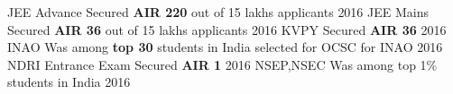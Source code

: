 \begin{cvhonors}
  \cvhonor
    {JEE Advance}
    {Secured \textbf{AIR 220} out of 15 lakhs applicants}
    {}
    {2016}
  \cvhonor
    {JEE Mains}
    {Secured \textbf{AIR 36} out of 15 lakhs applicants}
    {}
    {2016}
  \cvhonor
    {KVPY}
    {Secured \textbf{AIR 36}}
    {}
    {2016}
  \cvhonor
    {INAO}
    {Was among \textbf{top 30} students in India selected for OCSC for INAO}
    {}
    {2016}
   \cvhonor
    {NDRI Entrance Exam}
    {Secured \textbf{AIR 1}}
    {}
    {2016}
   \cvhonor
    {NSEP,NSEC}
    {Was among top 1\% students in India}
    {}
    {2016}

\end{cvhonors}

